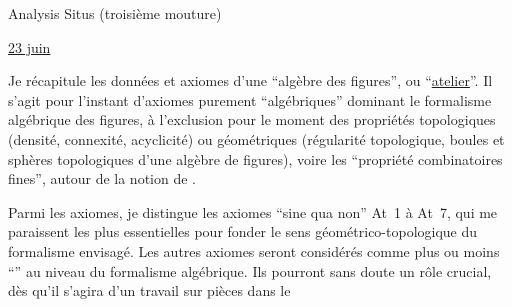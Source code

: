 \begin{center}Analysis Situs (troisième mouture)\end{center}

\uline{23 juin}

Je récapitule les données et axiomes d'une ``algèbre des figures'', ou ``\uline{atelier}''. \margin{\unsure{--}}Il s'agit pour l'instant d'axiomes purement ``algébriques'' dominant le formalisme algébrique des figures, à l'exclusion pour le moment des propriétés topologiques (densité, connexité, acyclicité) ou  géométriques (régularité topologique, boules et sphères topologiques d'une algèbre de figures), voire les ``propriété combinatoires fines'', autour de la notion de .

Parmi les axiomes, je distingue les axiomes ``sine qua non'' At~1 à At~7, qui me paraissent les plus essentielles pour fonder le sens géométrico-topologique du formalisme envisagé. Les autres axiomes seront considérés comme plus ou moins ``'' au niveau du formalisme algébrique. Ils pourront sans doute un rôle crucial, dès qu'il s'agira d'un travail sur pièces dans le

